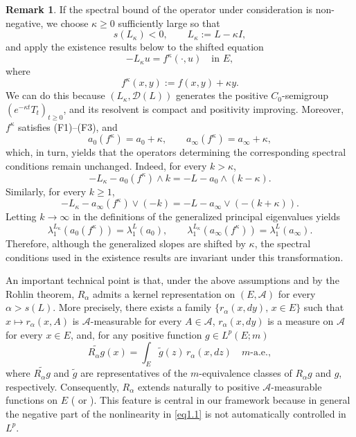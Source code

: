 \documentclass[11pt,a4paper,reqno]{amsart}
\theoremstyle{definition}
\newtheorem{remark}[theorem]{Remark}
\numberwithin{equation}{section}
\begin{document}
\begin{remark}
\label{rem.shift1}
If the spectral bound of the operator  under consideration is non-negative, we choose
$\kappa\ge 0$ sufficiently large so that
\[
s(L_\kappa)<0,
\qquad
L_\kappa:=L-\kappa I,
\]
and apply the existence results below to the shifted equation
\begin{equation}\label{eq1.1l}
    -L_\kappa u=f^\kappa(\cdot,u)\quad\text{in }E,
\end{equation}
where
\[
f^\kappa(x,y):=f(x,y)+\kappa y.
\]
We can do this because $(L_\kappa,\mathscr D(L))$ generates the positive
$C_0$-semigroup $(e^{-\kappa t}T_t)_{t\ge0}$, and its resolvent is
compact and positivity improving.  Moreover,
$f^\kappa$ satisfies \textup{(F1)--(F3)}, and 
\[
a_0(f^\kappa)=a_0+\kappa,
\qquad
a_\infty(f^\kappa)=a_\infty+\kappa,
\]
which, in turn,  yields that 
the operators determining the corresponding spectral conditions remain
unchanged. 
Indeed, for every $k>\kappa$,
\[
-L_\kappa-a_0(f^\kappa)\wedge k
=
-L-a_0\wedge(k-\kappa).
\]
Similarly, for every $k\ge1$,
\[
-L_\kappa-a_\infty(f^\kappa)\vee(-k)
=
-L-a_\infty\vee(-(k+\kappa)).
\]
Letting $k\to\infty$ in the definitions of the generalized principal
eigenvalues yields
\[
\lambda_1^{L_\kappa}(a_0(f^\kappa))
=
\lambda_1^{L}(a_0),
\qquad
\lambda_1^{L_\kappa}(a_\infty(f^\kappa))
=
\lambda_1^{L}(a_\infty).
\]
Therefore, although the generalized slopes are shifted by $\kappa$, the
spectral conditions used in the existence results are invariant under this
transformation.
\end{remark}


An important   technical point is that, under the above assumptions and by
 the Rohlin theorem, $R_\alpha$ admits a kernel representation on $(E,\mathcal A)$
for every  $\alpha>s(L)$. More precisely,  there exists a family $\{r_\alpha(x,dy),\, x\in E\}$
such that $x\mapsto r_\alpha(x,A)$ is $\mathcal A$-measurable for every 
$A\in\mathcal A$, $r_\alpha(x,dy)$ is a  measure on $\mathcal A$ 
for every  $x\in E$, and,  for any positive  function $g\in L^p(E;m)$
\begin{equation}
\label{eq.rochlin}
\widetilde{R_\alpha g}(x)=\int_E \tilde g(z)\,r_\alpha(x,dz)\quad m\text{-a.e.},
\end{equation}
where $\widetilde{R_\alpha g}$ and $\tilde g$ are representatives of the 
$m$-equivalence classes of $R_\alpha g$ and $g$, respectively.
Consequently,  $R_\alpha$ extends naturally to positive $\mathcal A$-measurable functions on  $E$  (\cite[Theorem 2.1]{Simmons} 
or \cite[Theorem 2.2]{BBR}).  This feature is central in our framework because 
in general the negative part of the nonlinearity in \eqref{eq1.1} 
is not automatically controlled in $L^p$.
\end{document}

